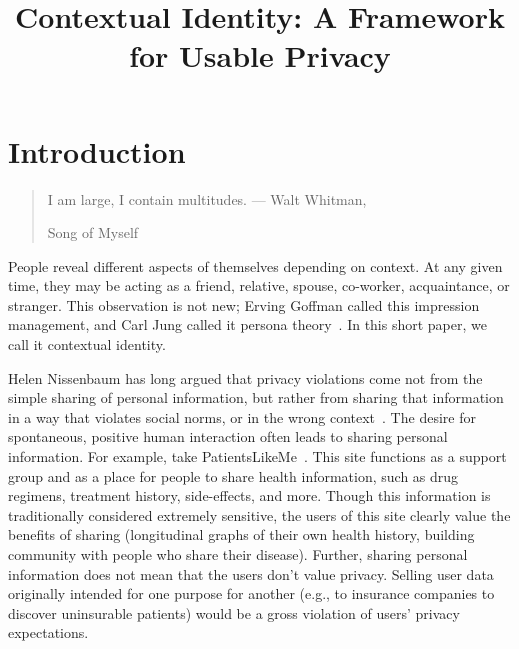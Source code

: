 \documentclass{llncs}
\begin{document}
\title{Contextual Identity: A Framework for Usable Privacy}

\maketitle
\section{Introduction}
\begin{quote}I am large, I contain multitudes. --- Walt Whitman,
\begin{em}Song of Myself\end{em} \end{quote}

People reveal different aspects of themselves depending on context. At any
given time, they may be acting as a friend, relative, spouse, co-worker,
acquaintance, or stranger. This observation is not new; Erving Goffman called
this impression management, and Carl Jung called it persona
theory~\cite{goffman,jung}. In this short paper, we call it contextual identity.

Helen Nissenbaum has long argued that privacy violations come not from the
simple sharing of personal information, but rather from sharing that
information in a way that violates social norms, or in the wrong
context~\cite{nissenbaum}. The desire for spontaneous, positive human
interaction often leads to sharing personal information. For example, take
PatientsLikeMe~\cite{patientslikeme}. This site functions as a support group
and as a place for people to share health information, such as drug regimens,
treatment history, side-effects, and more. Though this information is
traditionally considered extremely sensitive, the users of this site clearly
value the benefits of sharing (longitudinal graphs of their own health history,
building community with people who share their disease). Further, sharing
personal information does not mean that the users don't value privacy.  Selling
user data originally intended for one purpose for another (e.g., to insurance
companies to discover uninsurable patients) would be a gross violation of
users' privacy expectations.

\end{document}
